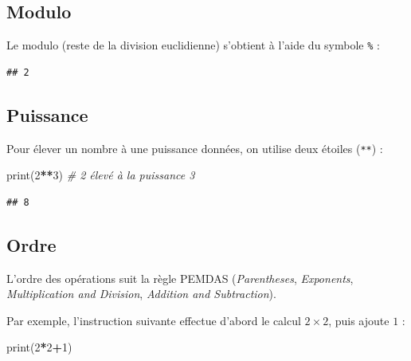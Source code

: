 \documentclass[12pt,]{book}
\newenvironment{Shaded}{\begin{snugshade}}{\end{snugshade}}
\newcommand{\DecValTok}[1]{\textcolor[rgb]{0.00,0.00,0.81}{#1}}
\newcommand{\CommentTok}[1]{\textcolor[rgb]{0.56,0.35,0.01}{\textit{#1}}}
\newcommand{\OperatorTok}[1]{\textcolor[rgb]{0.81,0.36,0.00}{\textbf{#1}}}
\newcommand{\BuiltInTok}[1]{#1}
\newcommand{\NormalTok}[1]{#1}
\numberwithin{equation}{section}
\numberwithin{countremarque}{section}
\begin{document}
\subsection{Modulo}\label{modulo}

Le modulo (reste de la division euclidienne) s'obtient à l'aide du
symbole \texttt{\%} :

\begin{Shaded}
\end{Shaded}

\begin{lstlisting}
## 2
\end{lstlisting}

\subsection{Puissance}\label{puissance}

Pour élever un nombre à une puissance données, on utilise deux étoiles
(\texttt{**}) :

\begin{Shaded}
\begin{Highlighting}[]
\BuiltInTok{print}\NormalTok{(}\DecValTok{2}\OperatorTok{**}\DecValTok{3}\NormalTok{) }\CommentTok{# 2 élevé à la puissance 3}
\end{Highlighting}
\end{Shaded}

\begin{lstlisting}
## 8
\end{lstlisting}

\subsection{Ordre}\label{ordre}

L'ordre des opérations suit la règle PEMDAS (\emph{Parentheses},
\emph{Exponents}, \emph{Multiplication and Division}, \emph{Addition and
Subtraction}).

Par exemple, l'instruction suivante effectue d'abord le calcul
\(2\times 2\), puis ajoute \(1\) :

\begin{Shaded}
\begin{Highlighting}[]
\BuiltInTok{print}\NormalTok{(}\DecValTok{2}\OperatorTok{*}\DecValTok{2}\OperatorTok{+}\DecValTok{1}\NormalTok{) }
\end{Highlighting}
\end{Shaded}
\end{document}
